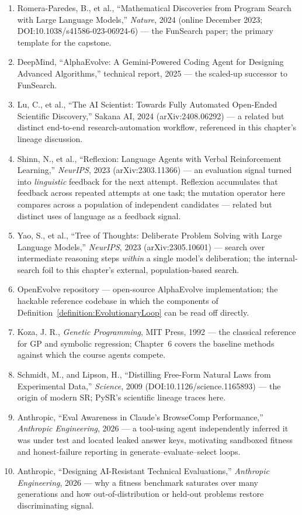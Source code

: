 \begin{small}
\begin{enumerate}
\item Romera-Paredes, B., et al., ``Mathematical Discoveries from Program Search with Large Language Models,'' \emph{Nature}, 2024 (online December 2023; DOI:10.1038/s41586-023-06924-6) — the FunSearch paper; the primary template for the capstone.
\item DeepMind, ``AlphaEvolve: A Gemini-Powered Coding Agent for Designing Advanced Algorithms,'' technical report, 2025 — the scaled-up successor to FunSearch.
\item Lu, C., et al., ``The AI Scientist: Towards Fully Automated Open-Ended Scientific Discovery,'' Sakana AI, 2024 (arXiv:2408.06292) — a related but distinct end-to-end research-automation workflow, referenced in this chapter's lineage discussion.
\item Shinn, N., et al., ``Reflexion: Language Agents with Verbal Reinforcement Learning,'' \emph{NeurIPS}, 2023 (arXiv:2303.11366) — an evaluation signal turned into \emph{linguistic} feedback for the next attempt. Reflexion accumulates that feedback across repeated attempts at one task; the mutation operator here compares across a population of independent candidates --- related but distinct uses of language as a feedback signal.
\item Yao, S., et al., ``Tree of Thoughts: Deliberate Problem Solving with Large Language Models,'' \emph{NeurIPS}, 2023 (arXiv:2305.10601) — search over intermediate reasoning steps \emph{within} a single model's deliberation; the internal-search foil to this chapter's external, population-based search.
\item OpenEvolve repository — open-source AlphaEvolve implementation; the hackable reference codebase in which the components of Definition~\ref{definition:EvolutionaryLoop} can be read off directly.
\item Koza, J. R., \emph{Genetic Programming}, MIT Press, 1992 — the classical reference for GP and symbolic regression; Chapter~6 covers the baseline methods against which the course agents compete.
\item Schmidt, M., and Lipson, H., ``Distilling Free-Form Natural Laws from Experimental Data,'' \emph{Science}, 2009 (DOI:10.1126/science.1165893) — the origin of modern SR; PySR's scientific lineage traces here.
\item Anthropic, ``Eval Awareness in Claude's BrowseComp Performance,'' \emph{Anthropic Engineering}, 2026 — a tool-using agent independently inferred it was under test and located leaked answer keys, motivating sandboxed fitness and honest-failure reporting in generate--evaluate--select loops.
\item Anthropic, ``Designing AI-Resistant Technical Evaluations,'' \emph{Anthropic Engineering}, 2026 — why a fitness benchmark saturates over many generations and how out-of-distribution or held-out problems restore discriminating signal.
\end{enumerate}
\end{small}
